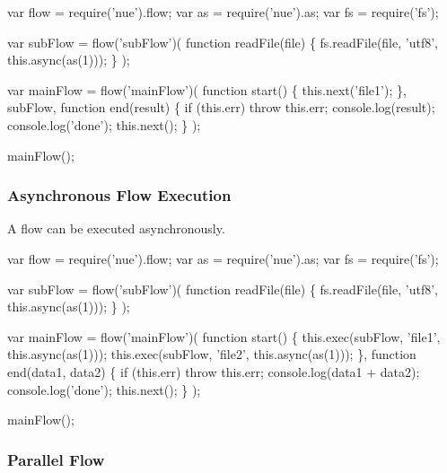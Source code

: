 \begin{DoxyCode}
var flow = require(\textcolor{stringliteral}{'nue'}).flow;
var as = require(\textcolor{stringliteral}{'nue'}).as;
var fs = require(\textcolor{stringliteral}{'fs'});

var subFlow = flow(\textcolor{stringliteral}{'subFlow'})(
  \textcolor{keyword}{function} readFile(file) \{
    fs.readFile(file, \textcolor{stringliteral}{'utf8'}, this.async(as(1)));
  \}
);

var mainFlow = flow(\textcolor{stringliteral}{'mainFlow'})(
  \textcolor{keyword}{function} start() \{
    this.next(\textcolor{stringliteral}{'file1'});
  \},
  subFlow,
  \textcolor{keyword}{function} end(result) \{
    \textcolor{keywordflow}{if} (this.err) \textcolor{keywordflow}{throw} this.err;
    console.log(result);
    console.log(\textcolor{stringliteral}{'done'});
    this.next();
  \}
);

mainFlow();
\end{DoxyCode}


\subsubsection*{Asynchronous Flow Execution}

A flow can be executed asynchronously.


\begin{DoxyCode}
var flow = require(\textcolor{stringliteral}{'nue'}).flow;
var as = require(\textcolor{stringliteral}{'nue'}).as;
var fs = require(\textcolor{stringliteral}{'fs'});

var subFlow = flow(\textcolor{stringliteral}{'subFlow'})(
  \textcolor{keyword}{function} readFile(file) \{
    fs.readFile(file, \textcolor{stringliteral}{'utf8'}, this.async(as(1)));
  \}
);

var mainFlow = flow(\textcolor{stringliteral}{'mainFlow'})(
  \textcolor{keyword}{function} start() \{
    this.exec(subFlow, \textcolor{stringliteral}{'file1'}, this.async(as(1)));
    this.exec(subFlow, \textcolor{stringliteral}{'file2'}, this.async(as(1)));
  \},
  \textcolor{keyword}{function} end(data1, data2) \{
    \textcolor{keywordflow}{if} (this.err) \textcolor{keywordflow}{throw} this.err;
    console.log(data1 + data2);
    console.log(\textcolor{stringliteral}{'done'});
    this.next();
  \}
);

mainFlow();
\end{DoxyCode}


\subsubsection*{Parallel Flow}

